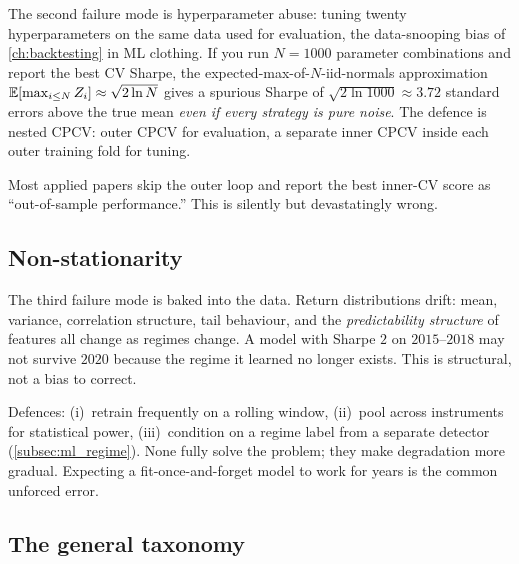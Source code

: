 The second failure mode is hyperparameter abuse: tuning twenty
hyperparameters on the same data used for evaluation, the
data-snooping bias of \cref{ch:backtesting} in ML clothing. If you
run $N = 1000$ parameter combinations and report the best CV
Sharpe, the expected-max-of-$N$-iid-normals approximation
$\mathbb{E}[\max_{i \le N} Z_i] \approx \sqrt{2 \ln N}$ gives a spurious
Sharpe of $\sqrt{2 \ln 1000} \approx 3.72$ standard errors above
the true mean \emph{even if every strategy is pure noise}. The
defence is nested CPCV: outer CPCV for evaluation, a separate
inner CPCV inside each outer training fold for tuning.

Most applied papers skip the outer loop and report the best
inner-CV score as ``out-of-sample performance.'' This is silently
but devastatingly wrong.

\subsection{Non-stationarity}
\label{subsec:ml_nonstationary}

The third failure mode is baked into the data. Return
distributions drift: mean, variance, correlation structure, tail
behaviour, and the \emph{predictability structure} of features
all change as regimes change. A model with Sharpe $2$ on
$2015$--$2018$ may not survive $2020$ because the regime it
learned no longer exists. This is structural, not a bias to
correct.

Defences: (i)~retrain frequently on a rolling window, (ii)~pool
across instruments for statistical power, (iii)~condition on a
regime label from a separate detector (\cref{subsec:ml_regime}).
None fully solve the problem; they make degradation more gradual.
Expecting a fit-once-and-forget model to work for years is the
common unforced error.

\subsection{The general taxonomy}
\label{subsec:ml_general_taxonomy}

